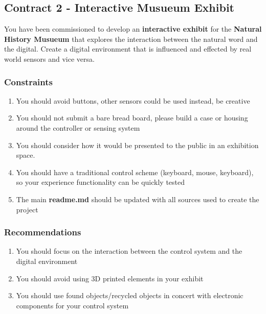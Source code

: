 \documentclass{../../fal_assignment}
\begin{document}
\subsection*{Contract 2 - Interactive Musueum Exhibit}

You have been commissioned to develop an \textbf{interactive exhibit} for the \textbf{Natural History Musueum} that explores the interaction between the natural word and the digital. Create a digital environment that is influenced and effected by real world sensors and vice versa.
\subsubsection*{Constraints}
\begin{enumerate}
	\item You should avoid buttons, other sensors could be used instead, be creative
	\item You should not submit a bare bread board, please build a case or housing around the controller or sensing system
	\item You should consider how it would be presented to the public in an exhibition space.
	\item You should have a traditional control scheme (keyboard, mouse, keyboard), so your experience functionality can be quickly tested 
	\item The main \textbf{readme.md} should be updated with all sources used to create the project
\end{enumerate}

\subsubsection*{Recommendations}
\begin{enumerate}
	\item You should focus on the interaction between the control system and the digital environment
	\item You should avoid using 3D printed elements in your exhibit
	\item You should use found objects/recycled objects in concert with electronic components for your control system

\end{enumerate}
\end{document}
